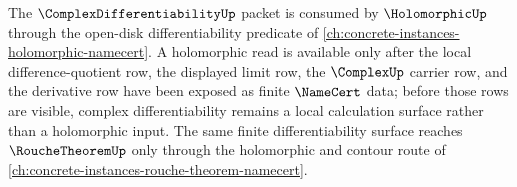 The $\ComplexDifferentiabilityUp$ packet is consumed by $\HolomorphicUp$ through the open-disk differentiability predicate of \autoref{ch:concrete-instances-holomorphic-namecert}. A holomorphic read is available only after the local difference-quotient row, the displayed limit row, the $\ComplexUp$ carrier row, and the derivative row have been exposed as finite $\NameCert$ data; before those rows are visible, complex differentiability remains a local calculation surface rather than a holomorphic input. The same finite differentiability surface reaches $\RoucheTheoremUp$ only through the holomorphic and contour route of \autoref{ch:concrete-instances-rouche-theorem-namecert}.
